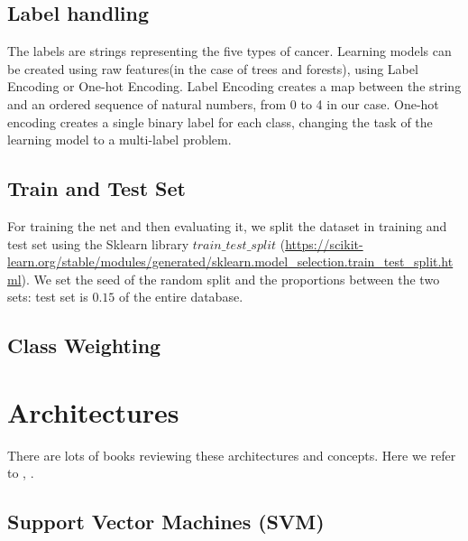 \documentclass{article}
\begin{document}
\subsection{Label handling}
The labels are strings representing the five types of cancer. Learning models can be created using raw features(in the case of trees and forests), using Label Encoding or One-hot Encoding.
Label Encoding creates a map between the string and an ordered sequence of natural numbers, from 0 to 4 in our case.
One-hot encoding creates a single binary label for each class, changing the task of the learning model to a multi-label problem.



\subsection{Train and Test Set}

For training the net and then evaluating it, we split the dataset in training and test set using the Sklearn library $train\_test\_split$ (\url{https://scikit-learn.org/stable/modules/generated/sklearn.model_selection.train_test_split.html}). We set the seed of the random split and the proportions between the two sets: test set is $0.15$ of the entire database.


\subsection{Class Weighting}




\section{Architectures}
There are lots of books reviewing these architectures and concepts. Here we refer to \cite{geron2017hands} , \cite{bishop2006pattern} \cite{hertz1991introduction}.


\subsection{Support Vector Machines (SVM)}
\end{document}
